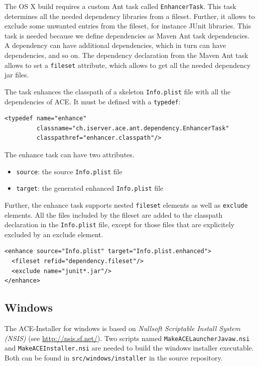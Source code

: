 \documentclass[11pt,a4paper]{article}
\begin{document}
The OS X build requires a custom Ant task called \texttt{EnhancerTask}. 
This task determines all the needed
dependency libraries from a fileset. Further, it allows to exclude some
unwanted entries from the fileset, for instance JUnit libraries.
This task is needed because we define dependencies as Maven Ant task
dependencies. A dependency can have additional dependencies, which in turn
can have dependencies, and so on. The dependency declaration from 
the Maven Ant task allows to set a \texttt{fileset} attribute, which allows to
get all the needed dependency jar files.

The task enhances the classpath of a skeleton \texttt{Info.plist} file with all
the dependencies of ACE. It must be defined with a \texttt{typedef}:
\small{
\begin{verbatim}
<typedef name="enhance"
         classname="ch.iserver.ace.ant.dependency.EnhancerTask"
         classpathref="enhancer.classpath"/>
\end{verbatim}
}

The enhance task can have two attributes.
\begin{itemize}
 \item \texttt{source}: the source \texttt{Info.plist} file
 \item \texttt{target}: the generated enhanced \texttt{Info.plist} file
\end{itemize}

Further, the enhance task supports nested \texttt{fileset} elements as well
as \texttt{exclude} elements. All the files included by the fileset are
added to the classpath declaration in the \texttt{Info.plist} file, except
for those files that are explicitely excluded by an exclude element.

\small{
\begin{verbatim}
<enhance source="Info.plist" target="Info.plist.enhanced">
  <fileset refid="dependency.fileset"/>
  <exclude name="junit*.jar"/>
</enhance>
\end{verbatim}
}


\subsection{Windows}
The ACE-Installer for windows is based on \textit{Nullsoft Scriptable Install System (NSIS)} (see \href{http://nsis.sf.net/}{http://nsis.sf.net/}). Two scripts named \texttt{MakeACELauncherJavaw.nsi} and \texttt{MakeACEInstaller.nsi} are needed to build the windows installer executable. Both can be found in \texttt{src/windows/installer} in the source repository.
\end{document}
